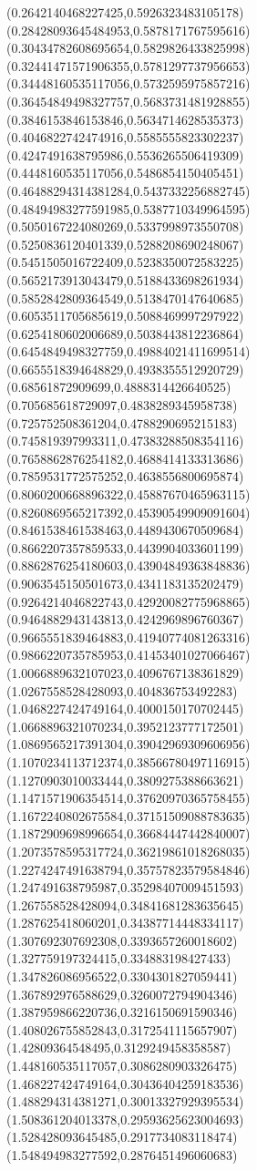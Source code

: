 {(0.2642140468227425,0.5926323483105178)
(0.28428093645484953,0.5878171767595616)
(0.30434782608695654,0.5829826433825998)
(0.32441471571906355,0.5781297737956653)
(0.34448160535117056,0.5732595975857216)
(0.36454849498327757,0.5683731481928855)
(0.3846153846153846,0.5634714628535373)
(0.4046822742474916,0.5585555823302237)
(0.4247491638795986,0.5536265506419309)
(0.4448160535117056,0.5486854150405451)
(0.46488294314381284,0.5437332256882745)
(0.48494983277591985,0.5387710349964595)
(0.5050167224080269,0.5337998973550708)
(0.5250836120401339,0.5288208690248067)
(0.5451505016722409,0.5238350072583225)
(0.5652173913043479,0.5188433698261934)
(0.5852842809364549,0.5138470147640685)
(0.6053511705685619,0.5088469997297922)
(0.6254180602006689,0.5038443812236864)
(0.6454849498327759,0.49884021411699514)
(0.6655518394648829,0.4938355512920729)
(0.68561872909699,0.4888314426640525)
(0.705685618729097,0.4838289345958738)
(0.725752508361204,0.4788290695215183)
(0.745819397993311,0.47383288508354116)
(0.7658862876254182,0.4688414133313686)
(0.7859531772575252,0.4638556800695874)
(0.8060200668896322,0.45887670465963115)
(0.8260869565217392,0.45390549909091604)
(0.8461538461538463,0.4489430670509684)
(0.8662207357859533,0.4439904033601199)
(0.8862876254180603,0.43904849363848836)
(0.9063545150501673,0.4341183135202479)
(0.9264214046822743,0.42920082775968865)
(0.9464882943143813,0.4242969896760367)
(0.9665551839464883,0.41940774081263316)
(0.9866220735785953,0.41453401027066467)
(1.0066889632107023,0.4096767138361829)
(1.0267558528428093,0.404836753492283)
(1.0468227424749164,0.4000150170702445)
(1.0668896321070234,0.3952123777172501)
(1.0869565217391304,0.39042969309606956)
(1.1070234113712374,0.38566780497116915)
(1.1270903010033444,0.3809275388663621)
(1.1471571906354514,0.37620970365758455)
(1.1672240802675584,0.37151509088783635)
(1.1872909698996654,0.36684447442840007)
(1.2073578595317724,0.36219861018268035)
(1.2274247491638794,0.35757823579584846)
(1.247491638795987,0.35298407009451593)
(1.267558528428094,0.34841681283635645)
(1.287625418060201,0.34387714448334117)
(1.307692307692308,0.3393657260018602)
(1.327759197324415,0.334883198427433)
(1.347826086956522,0.3304301827059441)
(1.367892976588629,0.3260072794904346)
(1.387959866220736,0.3216150691590346)
(1.408026755852843,0.3172541115657907)
(1.42809364548495,0.3129249458358587)
(1.448160535117057,0.3086280903326475)
(1.468227424749164,0.30436404259183536)
(1.488294314381271,0.30013327929395534)
(1.508361204013378,0.29593625623004693)
(1.528428093645485,0.2917734083118474)
(1.548494983277592,0.2876451496060683)
}
